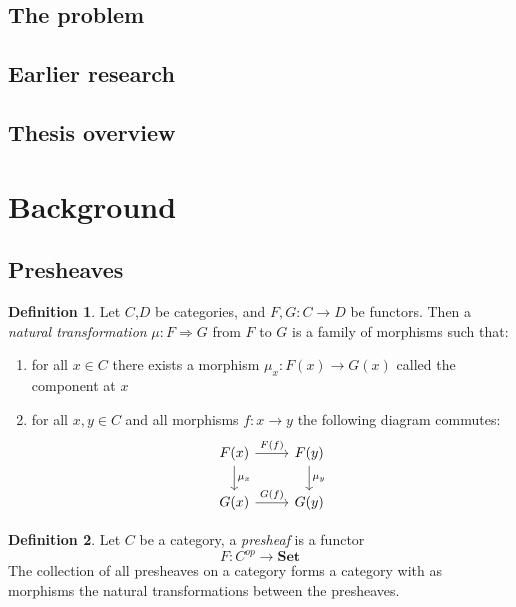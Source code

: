 \documentclass[12pt]{article}
\theoremstyle{definition}
\newtheorem{definition}{Definition}[section]
\newcommand{\1}{\mathbbm{1}}
\newcommand{\Set}{\mathbf{Set}}
\begin{document}
\subsection{The problem}

\subsection{Earlier research}

\subsection{Thesis overview}

\newpage
\section{Background}
\subsection{Presheaves}
\begin{definition}
    Let $C$,$D$ be categories, and $F,G: C\to D$ be functors. Then a \emph{natural transformation} $\mu: F\Rightarrow G$ from $F$ to $G$ is a family of morphisms such that:
    \begin{enumerate}
        \item for all $x\in C$ there exists a morphism $\mu_x: F(x)\to G(x)$ called the component at $x$
        \item for all $x,y\in C$ and all morphisms $f: x\to y$ the following diagram commutes:
        \begin{equation}\label{eq:nat-trans}
            \begin{tikzcd}
                F(x) \arrow{r}{F(f)} \arrow{d}{\mu_x} & F(y) \arrow{d}{\mu_y} \\
                G(x) \arrow{r}{G(f)} & G(y)
            \end{tikzcd}
        \end{equation}
    \end{enumerate}
\end{definition}

\begin{definition}
    Let $C$ be a category, a \emph{presheaf} is a functor \[
        F: C^{op}\to \Set
    \]
    The collection of all presheaves on a category forms a category with as morphisms the natural transformations between the presheaves.
\end{definition}
\end{document}
